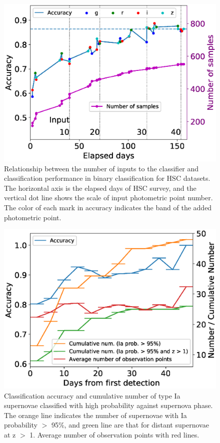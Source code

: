 \documentclass[useamsfonts]{pasj01}
\begin{document}
%
\begin{figure}[ht]
  \begin{center}
     \includegraphics[width=\columnwidth]{figures/n_observations_v2.eps}
  \end{center}
  \caption{%
  Relationship between the number of inputs to the classifier and classification performance in binary classification for HSC datasets. 
  The horizontal axis is the elapsed days of HSC survey, and the vertical dot line shows the scale of input photometric point number. 
  The color of each mark in accuracy indicates the band of the added photometric point.
  }%
  \label{fig:n_observations}
\end{figure}
%
%
\begin{figure}[ht]
  \begin{center}
     \includegraphics[width=\columnwidth]{figures/n_observations_SNphase_191227.eps}
  \end{center}
  \caption{%
  Classification accuracy and cumulative number of type Ia supernovae classified with high probability against supernova phase.
  The orange line indicates the number of supernovae with Ia probability $>$ 95\%, and green line are that for distant supernovae at z $>$ 1. Average number of observation points with red lines.
  }%
  \label{fig:n_observations_SNphase}
\end{figure}
\end{document}
